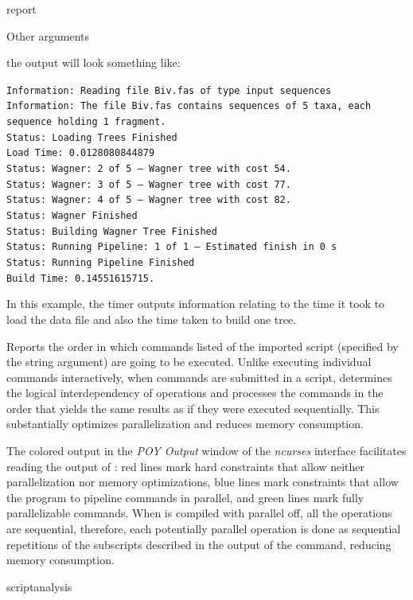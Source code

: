 \begin{command}{report}{}
\begin{arguments}
\begin{argumentgroup}{Other arguments}
\begin{statement}
the output will look something like:
\begin{flushleft}   
\texttt{Information: Reading file Biv.fas of type input sequences\\
Information: The file Biv.fas contains sequences of 5 taxa, each
sequence holding 1 fragment.\\
Status: Loading Trees Finished\\
Load Time: 0.0128080844879\\
Status: Wagner: 2 of 5 -- Wagner tree with cost 54.\\
Status: Wagner: 3 of 5 -- Wagner tree with cost 77.\\
Status: Wagner: 4 of 5 -- Wagner tree with cost 82.\\
Status: Wagner Finished\\
Status: Building Wagner Tree Finished\\
Status: Running Pipeline: 1 of 1 -- Estimated finish in 0 s\\
Status: Running Pipeline Finished\\
Build Time: 0.14551615715.}
\end{flushleft}
In this example, the timer outputs information relating to the time it took 
\poy to load the data file and also the time taken to build one tree.
\end{statement}


{Reports the order in which commands listed of the imported
script (specified by the string argument) are going to be executed.
Unlike executing individual commands interactively, when commands are submitted in a 
script, \poy determines the logical interdependency of operations
and processes the commands in the order that yields the same
results as if they were executed sequentially. This substantially
optimizes parallelization and reduces memory consumption.

\setlength{\parindent}{0.5cm}                
\indent 
The colored output in the \emph{POY Output} window of the \emph{ncurses}
interface facilitates reading the output of :
red lines mark hard constraints that allow neither
parallelization nor memory optimizations, blue lines mark 
constraints that allow the program to pipeline commands in
parallel, and green lines mark fully parallelizable commands. When \poy
is compiled with parallel off, all the operations are
sequential, therefore, each potentially parallel operation is
done as sequential repetitions of the subscripts described in
the output of the command, reducing memory consumption.}
{scriptanalysis}


\end{argumentgroup}
\end{arguments}
\end{command}
